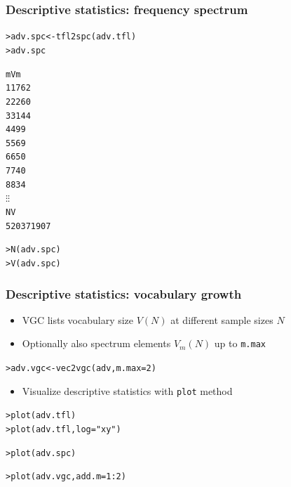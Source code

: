 \documentclass[t]{beamer} %
\begin{document}
\begin{frame}[fragile]
  \frametitle{Descriptive statistics: frequency spectrum}

  \ungap[1]
\begin{alltt}
> adv.spc <- tfl2spc(adv.tfl)  
> adv.spc \begin{Rout}
    m  Vm
1   1 762
2   2 260
3   3 144
4   4  99
5   5  69
6   6  50
7   7  40
8   8  34
    \(\vdots\)   \(\vdots\)
     N    V
 52037 1907
\end{Rout}
> N(adv.spc)  
> V(adv.spc)  
\end{alltt}
\end{frame}

\begin{frame}[fragile]
  \frametitle{Descriptive statistics: vocabulary growth}

  \begin{itemize}
  \item VGC lists vocabulary size $V(N)$ at different sample sizes $N$
  \item Optionally also spectrum elements $V_m(N)$ up to \texttt{m.max}
  \end{itemize}
  
\begin{alltt}
> adv.vgc <- vec2vgc(adv, m.max=2) 
\end{alltt}

  \begin{itemize}
  \item Visualize descriptive statistics with \texttt{plot} method
  \end{itemize}

\begin{alltt}
> plot(adv.tfl)              
> plot(adv.tfl, log="xy")    

> plot(adv.spc)              

> plot(adv.vgc, add.m = 1:2) 
\end{alltt}

\end{frame}
\end{document}
